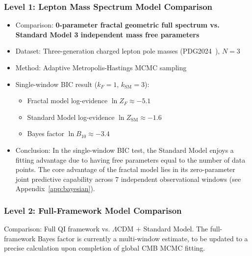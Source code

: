 \documentclass[12pt,a4paper,twocolumn]{article}
\begin{document}
\subsubsection{Level 1: Lepton Mass Spectrum Model Comparison}
\begin{itemize}
\item Comparison: \textbf{0-parameter fractal geometric full spectrum vs. Standard Model 3 independent mass free parameters}
\item Dataset: Three-generation charged lepton pole masses (PDG2024~\cite{PDG2024}), $N=3$
\item Method: Adaptive Metropolis-Hastings MCMC sampling
\item Single-window BIC result ($k_F=1$, $k_{\text{SM}}=3$):
  \begin{itemize}
  \item Fractal model log-evidence $\ln Z_F \approx -5.1$
  \item Standard Model log-evidence $\ln Z_{\text{SM}} \approx -1.6$
  \item Bayes factor $\ln B_{10} \approx -3.4$
  \end{itemize}
\item Conclusion: In the single-window BIC test, the Standard Model enjoys a fitting advantage due to having free parameters equal to the number of data points. The core advantage of the fractal model lies in its zero-parameter joint predictive capability across 7 independent observational windows (see Appendix~\ref{app:bayesian}).
\end{itemize}

\subsubsection{Level 2: Full-Framework Model Comparison}
Comparison: Full QI framework vs. $\Lambda$CDM + Standard Model. The full-framework Bayes factor is currently a multi-window estimate, to be updated to a precise calculation upon completion of global CMB MCMC fitting.
\end{document}
